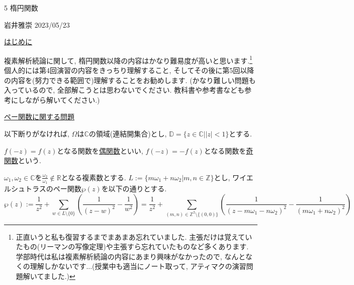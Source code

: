 \documentclass[dvipdfmx,a4paper,11pt]{article}
\newcommand{\R}{\mathbb{R}}
\newcommand{\Z}{\mathbb{Z}}
\newcommand{\C}{\mathbb{C}}
\newcommand{\D}{\mathbb{D}}
\theoremstyle{definition}
\begin{document}
 
\begin{center}
{\Large 5 楕円関数}
\end{center}

\begin{flushright}
 岩井雅崇 2023/05/23
\end{flushright}

\vspace{12pt}
\hspace{-24pt}\underline{はじめに}

\hspace{-12pt}複素解析続論に関して, 楕円関数以降の内容はかなり難易度が高いと思います.\footnote{正直いうと私も復習するまでまあまあ忘れていました. 主張だけは覚えていたもの(リーマンの写像定理)や主張すら忘れていたものなど多くあります. 学部時代は私は複素解析続論の内容にあまり興味がなかったので, なんとなくの理解しかないです...(授業中も適当にノート取って, アティマクの演習問題解いてました.) }
個人的には第4回演習の内容をきっちり理解すること, そしてその後に第5回以降の内容を(努力できる範囲で)理解することをお勧めします. (かなり難しい問題も入っているので, 全部解こうとは思わないでください. 教科書や参考書なども参考にしながら解いてください.)


\vspace{12pt}
\hspace{-24pt}\underline{ペー関数に関する問題}

\hspace{-12pt}以下断りがなければ, $\Omega$は$\C$の領域(連結開集合)とし, $\D=\{z \in \C |  |z| <1\}$とする. 

\hspace{-12pt}%
$f(-z)=f(z)$となる関数を\underline{偶関数}といい, $f(-z)=-f(z)$となる関数を\underline{奇関数}という.

\hspace{-12pt}$\omega_1, \omega_2 \in \C$を$\frac{\omega_2}{\omega_1} \not \in \R$となる複素数とする. $L := \{ m\omega_1 + n \omega_2 | m,n\in \Z\}$とし, ワイエルシュトラスのペー関数$\wp(z)$を以下の通りとする. 
$$\wp(z) := \frac{1}{z^2} + \sum_{w \in L \setminus \{ 0\}}\left(\frac{1}{(z-w)^2} - \frac{1}{w^2}\right)
= \frac{1}{z^2} + \sum_{(m,n) \in  \Z^2 \setminus \{ (0,0)\}}\left(\frac{1}{(z-m\omega_1 - n \omega_2)^2} - \frac{1}{(m\omega_1 + n \omega_2)^2}\right)
$$
\end{document}

